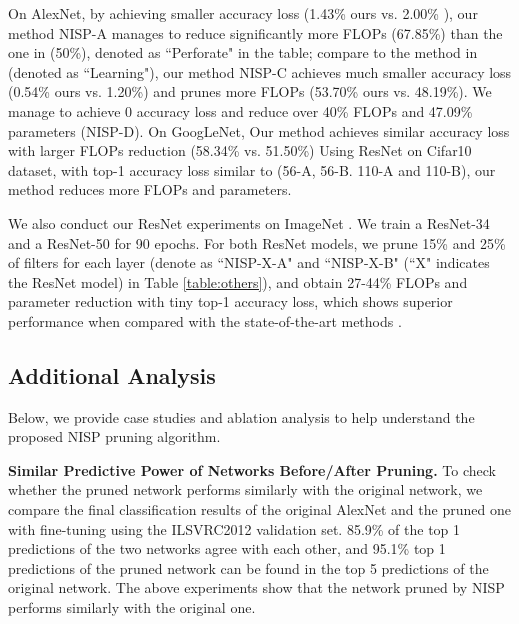 \documentclass[10pt,twocolumn,letterpaper]{article}
\begin{document}
On AlexNet, by achieving smaller accuracy loss (1.43\% ours vs. 2.00\% \cite{PerforatedCNN}), our method NISP-A manages to reduce significantly more FLOPs (67.85\%) than the one in \cite{PerforatedCNN} (50\%), denoted as ``Perforate" in the table; 
compare to the method in \cite{learning}  (denoted as ``Learning"), our method NISP-C achieves much smaller accuracy loss (0.54\% ours vs. 1.20\%) and prunes more FLOPs (53.70\% ours vs. 48.19\%). 
We manage to achieve 0 accuracy loss and reduce over 40\% FLOPs and 47.09\% parameters (NISP-D). 
On GoogLeNet, Our method achieves similar accuracy loss with larger FLOPs reduction (58.34\% vs. 51.50\%) 
Using ResNet on Cifar10 dataset, with top-1 accuracy loss similar to \cite{pruneweigth} (56-A, 56-B. 110-A and 110-B), our method reduces more FLOPs and parameters. 

We also conduct our ResNet experiments on ImageNet \cite{imagenet_cvpr09}. We train a ResNet-34 and a ResNet-50 for 90 epochs. 
For both ResNet models, we prune 15\% and 25\% of filters for each layer (denote as ``NISP-X-A" and ``NISP-X-B" (``X" indicates the ResNet model) in Table \ref{table:others}), and obtain 27-44\% FLOPs and parameter reduction with tiny top-1 accuracy loss, which shows superior performance when compared with the state-of-the-art methods \cite{pruneweigth,thinet}.

\subsection{Additional Analysis}
Below, we provide case studies and ablation analysis to help understand the proposed NISP pruning algorithm.

\textbf{Similar Predictive Power of Networks Before/After Pruning.} 
To check whether the pruned network performs similarly with the original network, we compare the final classification results of the original AlexNet and the pruned one with fine-tuning using the ILSVRC2012 validation set. 85.9\% of the top 1 predictions of the two networks agree with each other, and 95.1\% top 1 predictions of the pruned network can be found in the top 5 predictions of the original network.
The above experiments show that the network pruned by NISP performs similarly with the original one.
\end{document}
